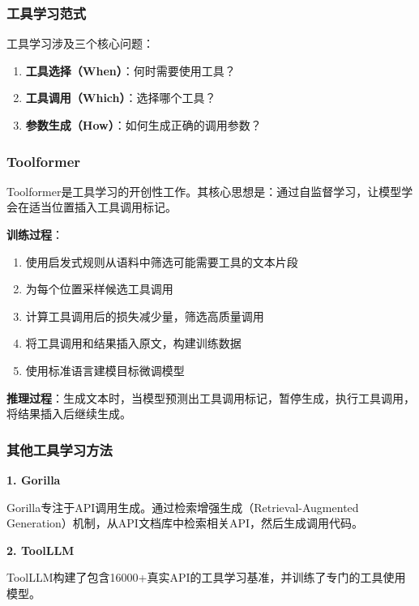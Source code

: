 \subsubsection{工具学习范式}

工具学习涉及三个核心问题：

\begin{enumerate}[leftmargin=2em]
    \item \textbf{工具选择（When）}：何时需要使用工具？
    \item \textbf{工具调用（Which）}：选择哪个工具？
    \item \textbf{参数生成（How）}：如何生成正确的调用参数？
\end{enumerate}

\subsubsection{Toolformer}

Toolformer\cite{schick2023toolformer}是工具学习的开创性工作。其核心思想是：通过自监督学习，让模型学会在适当位置插入工具调用标记。

\textbf{训练过程}：

\begin{enumerate}[leftmargin=2em]
    \item 使用启发式规则从语料中筛选可能需要工具的文本片段
    \item 为每个位置采样候选工具调用
    \item 计算工具调用后的损失减少量，筛选高质量调用
    \item 将工具调用和结果插入原文，构建训练数据
    \item 使用标准语言建模目标微调模型
\end{enumerate}

\textbf{推理过程}：生成文本时，当模型预测出工具调用标记，暂停生成，执行工具调用，将结果插入后继续生成。

\subsubsection{其他工具学习方法}

\textbf{1. Gorilla}

Gorilla专注于API调用生成。通过检索增强生成（Retrieval-Augmented Generation）机制，从API文档库中检索相关API，然后生成调用代码。

\textbf{2. ToolLLM}

ToolLLM构建了包含16000+真实API的工具学习基准，并训练了专门的工具使用模型。

